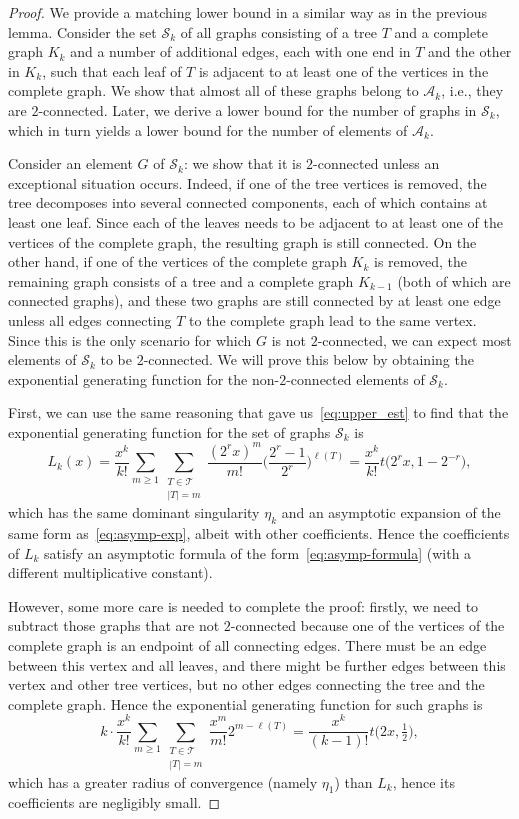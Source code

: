 \documentclass[a4paper]{article}
\newcommand{\A}{\mathcal{A}}
\newcommand{\T}{\mathcal{T}}
\newcommand{\cS}{\mathcal{S}}
\theoremstyle{remark}
\begin{document}
\begin{proof}
We provide a matching lower bound in a similar way as in the previous lemma. Consider the set $\cS_k$ of all graphs consisting of a tree $T$ and a complete graph $K_k$ and a number of additional edges, each with one end in $T$ and the other in $K_k$, such that each leaf of $T$ is adjacent to at least one of the vertices in the complete graph. We show that almost all of these graphs belong to $\A_k$, i.e., they are $2$-connected. Later, we derive a lower bound for the number of graphs in $\cS_k$, which in turn yields a lower bound for the number of elements of $\A_k$.

Consider an element $G$ of $\cS_k$: we show that it is $2$-connected unless an exceptional situation occurs.
Indeed, if one of the tree vertices is removed, the tree decomposes into several connected components, each of which contains at least one leaf. Since each of the leaves needs to be adjacent to at least one of the vertices of the complete graph, the resulting graph is still connected. On the other hand, if one of the vertices of the complete graph $K_k$ is removed, the remaining graph consists of a tree and a complete graph $K_{k-1}$ (both of which are connected graphs), and these two graphs are still connected by at least one edge unless all edges connecting $T$ to the complete graph lead to the same vertex. Since this is the only scenario for which $G$ is not $2$-connected, we can expect most elements of $\cS_k$ to be $2$-connected. We will prove this below by obtaining the exponential generating function for the non-$2$-connected elements of $\cS_k$.

First, we can use the same reasoning that gave us~\eqref{eq:upper_est} to find that the exponential generating function for the set of graphs $\cS_k$ is
$$L_k(x) = \frac{x^k}{k!} \sum_{m \geq 1} \sum_{\substack{T \in \T \\ |T| = m}} \frac{(2^r x)^m}{m!} \Big( \frac{2^r-1}{2^r} \Big)^{\ell(T)} = \frac{x^k}{k!} t \big( 2^r x, 1-2^{-r}\big),$$
which has the same dominant singularity $\eta_k$ and an asymptotic expansion of the same form as~\eqref{eq:asymp-exp}, albeit with other coefficients. Hence the coefficients of $L_k$ satisfy an asymptotic formula of the form~\eqref{eq:asymp-formula} (with a different multiplicative constant).

However, some more care is needed to complete the proof: firstly, we need to subtract those graphs that are not $2$-connected because one of the vertices of the complete graph is an endpoint of all connecting edges. There must be an edge between this vertex and all leaves, and there might be further edges between this vertex and other tree vertices, but no other edges connecting the tree and the complete graph. Hence the exponential generating function for such graphs is
$$k \cdot \frac{x^k}{k!} \sum_{m \geq 1} \sum_{\substack{T \in \T \\ |T| = m}} \frac{x^m}{m!} 2^{m-\ell(T)} =  \frac{x^k}{(k-1)!} t \big( 2x, \tfrac12\big),$$
which has a greater radius of convergence (namely $\eta_1$) than $L_k$, hence its coefficients are negligibly small.


\end{proof}
\end{document}
